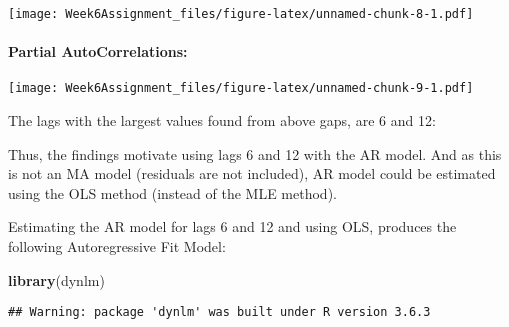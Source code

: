\documentclass[]{article}
\newenvironment{Shaded}{\begin{snugshade}}{\end{snugshade}}
\newcommand{\DataTypeTok}[1]{\textcolor[rgb]{0.13,0.29,0.53}{#1}}
\newcommand{\KeywordTok}[1]{\textcolor[rgb]{0.13,0.29,0.53}{\textbf{#1}}}
\newcommand{\NormalTok}[1]{#1}
\newcommand{\OperatorTok}[1]{\textcolor[rgb]{0.81,0.36,0.00}{\textbf{#1}}}
\newcommand{\StringTok}[1]{\textcolor[rgb]{0.31,0.60,0.02}{#1}}
\let\oldparagraph\paragraph
\renewcommand{\paragraph}[1]{\oldparagraph{#1}\mbox{}}
\begin{document}
\texttt{[image: Week6Assignment\_files/figure-latex/unnamed-chunk-8-1.pdf]}

\hypertarget{partial-autocorrelations}{%
\paragraph{Partial AutoCorrelations:}\label{partial-autocorrelations}}

\begin{Shaded}
\end{Shaded}

\texttt{[image: Week6Assignment\_files/figure-latex/unnamed-chunk-9-1.pdf]}

The lags with the largest values found from above gaps, are 6 and 12:

Thus, the findings motivate using lags 6 and 12 with the AR model. And
as this is not an MA model (residuals are not included), AR model could
be estimated using the OLS method (instead of the MLE method).

Estimating the AR model for lags 6 and 12 and using OLS, produces the
following Autoregressive Fit Model:

\begin{Shaded}
\begin{Highlighting}[]
\KeywordTok{library}\NormalTok{(dynlm)}
\end{Highlighting}
\end{Shaded}

\begin{verbatim}
## Warning: package 'dynlm' was built under R version 3.6.3
\end{verbatim}
\end{document}
